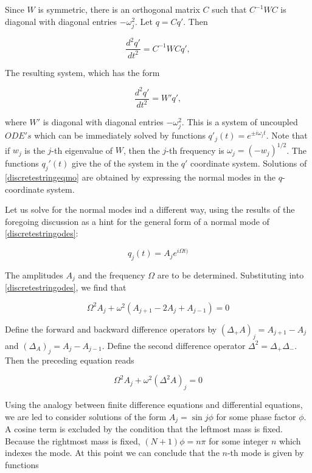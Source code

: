 Since $W$ is symmetric, there is an orthogonal matrix $C$ such that $C^{-1}WC$ is diagonal with diagonal entries $-\omega_j^2$.  Let $q = Cq'$.  Then

\begin{equation}
\frac{d^2 q'}{ dt^2} = C^{-1}WCq',
\end{equation}

The resulting system, which has the form

\begin{equation}
\frac{d^2 q'}{ dt^2} =W'q',
\end{equation}

where $W'$ is diagonal with diagonal entries $-\omega_j^2$.
This is a system of uncoupled $ODE's$ which can be immediately solved by functions $q'_j(t) = e^{\pm i \omega_jt}$.  Note that if $w_j$ is the $j$-th eigenvalue of $W$, then the $j$-th frequency is $\omega_j =(-w_j)^{1/2}$.
The functions $q_j'(t)$ give the  of the system in the $q'$ coordinate system.  Solutions of \eqref{discretestringeqmo} are obtained by expressing the normal modes in the $q$-coordinate system.

Let us solve for the normal modes ind a different way, using the results of the foregoing discussion as a hint for the general form of a normal mode of \eqref{discretestringodes}:

\begin{equation}
q_j(t) = A_j e^{i\Omega t)}
\end{equation}

The amplitudes $A_j$ and the frequency $\Omega$ are to be determined.  Substituting into \eqref{discretestringodes}, we find that

\begin{equation}
\label{discretestringdifferenceeq}
\Omega^2A_j + \omega^2(A_{j+1} - 2A_j + A_{j-1}) = 0
\end{equation}

Define the forward and backward difference operators by  $(\Delta_+ A)_j = A_{j+1} - A_{j}$ and $(\Delta_ A)_j = A_j - A_{j-1}$. Define the second difference operator $\Delta^2 = \Delta_+\Delta_-$.  Then the preceding equation reads

\begin{equation}
\Omega^2A_j + \omega^2( \Delta^2 A)_j = 0
\end{equation}

Using the analogy between finite difference equations and differential equations, we are led to consider solutions of the form $A_j  = \sin j\phi$ for some phase factor $\phi$.  A cosine term is excluded by the  condition that the leftmost mass is fixed.  Because the rightmost mass is fixed, $(N+1)\phi = n\pi$ for some integer $n$ which indexes the mode.  At this point we can conclude that the $n$-th mode is given by functions


